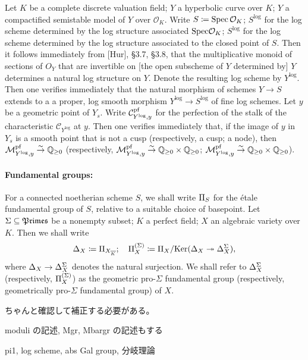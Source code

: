 Let $K$ be a complete discrete valuation field; $Y$ a hyperbolic curve over $K$; $Y$ a compactified semistable model of $Y$ over $\mathcal{O}_K$. Write $S \coloneqq \mathrm{Spec} \, \mathcal{O}_K$; $S^\log$ for the log scheme determined by the log structure associated $\mathrm{Spec} \mathcal{O}_K$; $S^\log$ for the log scheme determined by the log structure associated to the closed point of $S$. Then it follows immediately from [Hur], §3.7, §3.8, that the multiplicative monoid of sections of $O_Y$ that are invertible on [the open subscheme of $Y$ determined by] $Y$ determines a natural log structure on $Y$. Denote the resulting log scheme by $Y^\log$. Then one verifies immediately that the natural morphism of schemes $Y \to S$ extends to a a proper, log smooth morphism $Y^\log \to S^\log$ of fine log schemes. Let $y$ be a geometric point of $Y_s$. Write $\mathcal{C}_{Y^{\mathrm{log}}, y}^{\mathrm{pf}}$ for the perfection of the stalk of the characteristic $\mathcal{C}_{Y^\log}$ at $y$. Then one verifies immediately that, if the image of $y$ in $Y_s$ is a smooth point that is not a cusp (respectively, a cusp; a node), then
$\mathcal{M}_{Y^{\mathrm{log}}, y}^{\mathrm{pf}} \overset{\sim}{\to} \mathbb{Q}_{\ge 0}$ (respectively, $\mathcal{M}_{Y^{\mathrm{log}}, y}^{\mathrm{pf}} \overset{\sim}{\to} \mathbb{Q}_{\ge 0} \times \mathbb{Q}_{\ge 0}$; $\mathcal{M}_{Y^{\mathrm{log}}, y}^{\mathrm{pf}} \overset{\sim}{\to} \mathbb{Q}_{\ge 0} \times \mathbb{Q}_{\ge 0}$).



\paragraph*{Fundamental groups:}
For a connected noetherian scheme $S$, we shall write $\Pi_{S}$ for the \'{e}tale fundamental group of $S$, relative to a suitable choice of basepoint. Let $\Sigma \subseteq \mathfrak{Primes}$ be a nonempty subset; $K$ a perfect field; $X$ an algebraic variety over $K$. Then we shall write
\[
\Delta_{X} \coloneqq \Pi_{X_{\overline{K}}}; \quad \Pi^{(\Sigma)}_{X} \coloneqq \Pi_{X}/\mathrm{Ker}(\Delta_{X} \twoheadrightarrow \Delta_{X}^\Sigma),
\]
where $\Delta_{X} \to \Delta_{X}^\Sigma$ denotes the natural surjection. We shall refer to $\Delta_{X}^\Sigma$ (respectively, $\Pi^{(\Sigma)}_{X}$) as the geometric pro-$\Sigma$ fundamental group (respectively, geometrically pro-$\Sigma$ fundamental group) of $X$.


ちゃんと確認して補正する必要がある。

moduli の記述, Mgr, Mbargr の記述もする

pi1, log scheme, abs Gal group, 分岐理論